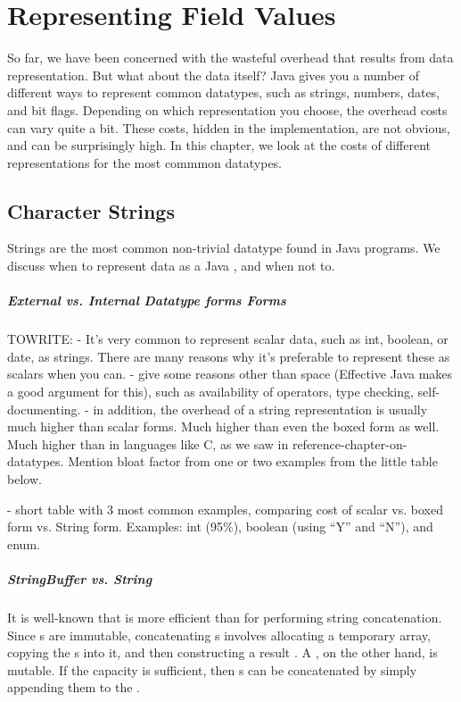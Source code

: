 \chapter{Representing Field Values}
\label{chapter:representing-values}

So far, we have been concerned with the wasteful overhead that results from
data representation. But what about the data itself?
Java gives you a number of different ways to represent common datatypes, such
as strings, numbers, dates, and bit flags. Depending on which
representation you choose, the overhead costs can vary quite a bit. 
These costs, hidden in the implementation, are not obvious, and can be
surprisingly high.
In this chapter, we look at the costs of different representations for the most 
commmon datatypes.

\section{Character Strings}
Strings are the most common non-trivial datatype found in Java programs. We
discuss when to represent data as a Java , and when not to.
\paragraph{External vs. Internal Datatype forms Forms}
TOWRITE:
- It's very common to represent scalar data, such as int, boolean, or date, as
strings. There are many reasons why it's preferable to represent these as
scalars when you can. - give some reasons other than space (Effective Java makes
a good argument for this), such as availability of operators, type checking, self-documenting.  - in
addition, the overhead of a string representation is usually much higher than scalar forms. 
Much higher than even the boxed form as well.  Much higher
than in languages like C, as we saw in reference-chapter-on-datatypes.  Mention
bloat factor from one or two examples from the little table below.

- short table with 3 most common examples, comparing cost of scalar
vs. boxed form vs. String form.  Examples: int (95\%), boolean (using ``Y''
and ``N''), and enum. 

\paragraph{StringBuffer vs. String}

It is well-known that  is more efficient than
 for performing string concatenation. Since s are
immutable, concatenating s involves allocating a temporary
 array, copying the s into it, and then constructing
a result . A , on the other hand, is mutable.
If the  capacity is sufficient, then s
can be concatenated by simply appending them to the .

